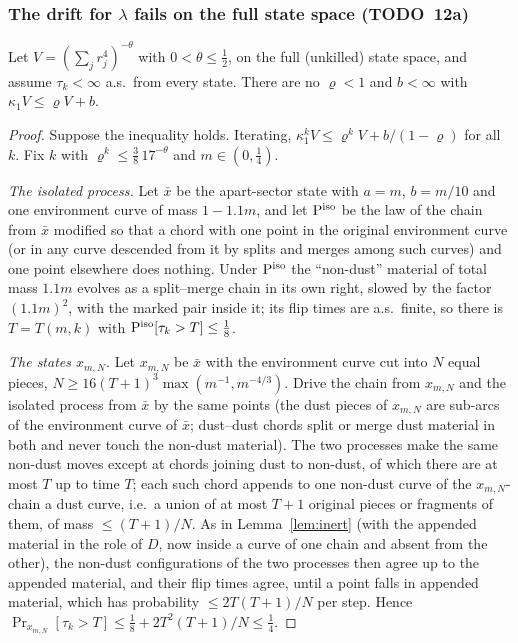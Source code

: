 \subsubsection{The drift for \texorpdfstring{$\lambda$}{lambda} fails
on the full state space (TODO~12a)}\label{sec:s12drift}

\begin{proposition}
\label{prop:nodrift}
Let $V=(\sum_jr_j^4)^{-\theta}$ with $0<\theta\le\tfrac12$, on the full
(unkilled) state space, and assume $\tau_k<\infty$ a.s.\ from every
state.  There are no $\varrho<1$ and $b<\infty$ with
$\kappa_1V\le\varrho V+b$.
\end{proposition}

\begin{proof}
Suppose the inequality holds.  Iterating,
$\kappa_1^kV\le\varrho^kV+b/(1-\varrho)$ for all $k$.  Fix $k$ with
$\varrho^k\le\tfrac38\,17^{-\theta}$ and $m\in(0,\tfrac14)$.

\emph{The isolated process.}  Let $\bar x$ be the apart-sector state
with $a=m$, $b=m/10$ and one environment curve of mass $1-1.1m$, and
let $\mathrm P^{\rm iso}$ be the law of the chain from $\bar x$ modified
so that a chord with one point in the original environment curve (or in
any curve descended from it by splits and merges among such curves)
and one point elsewhere does nothing.  Under $\mathrm P^{\rm iso}$ the
``non-dust'' material of total mass $1.1m$ evolves as a split--merge
chain in its own right, slowed by the factor $(1.1m)^2$, with the
marked pair inside it; its flip times are a.s.\ finite, so there is
$T=T(m,k)$ with $\mathrm P^{\rm iso}[\tau_k>T]\le\tfrac18$.

\emph{The states $x_{m,N}$.}  Let $x_{m,N}$ be $\bar x$ with the
environment curve cut into $N$ equal pieces,
$N\ge16(T+1)^3\max(m^{-1},m^{-4/3})$.  Drive the chain from $x_{m,N}$
and the isolated process from $\bar x$ by the same points (the dust
pieces of $x_{m,N}$ are sub-arcs of the environment curve of $\bar x$;
dust--dust chords split or merge dust material in both and never
touch the non-dust material).  The two processes make the same non-dust moves
except at chords joining dust to non-dust, of which there are at most
$T$ up to time $T$; each such chord appends to one non-dust curve of the
$x_{m,N}$-chain a dust curve, i.e.\ a union of at most $T+1$ original pieces or
fragments of them, of mass $\le(T+1)/N$.  As in Lemma~\ref{lem:inert} (with the
appended material in the role of $D$, now inside a curve of one chain
and absent from the other), the non-dust configurations of the two
processes then agree up to the appended material, and their flip times
agree, until a point falls in appended material, which has probability
$\le2T(T+1)/N$ per step.  Hence
$\Pr_{x_{m,N}}[\tau_k>T]\le\tfrac18+2T^2(T+1)/N\le\tfrac14$.


\end{proof}
